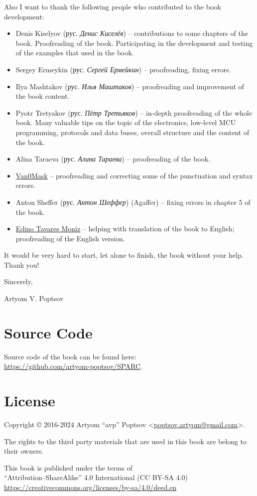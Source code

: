 \documentclass[../sparc.tex]{subfiles}
\begin{document}
Also I want to thank the following people who contributed to the book
development:
\begin{itemize}
\item Denis Kiselyov (рус. \emph{Денис Киселёв}) -- contributions to some
  chapters of the book.  Proofreading of the book.  Participating in the
  development and testing of the examples that used in the book.
\item Sergey Ermeykin (рус. \emph{Сергей Ермейкин}) -- proofreading, fixing
  errors.
\item Ilya Mashtakov (рус. \emph{Илья Маштаков}) – proofreading and improvement
  of the book content.
\item Pyotr Tretyakov (рус. \emph{Пётр Третьяков}) -- in-depth proofreading of
  the whole book.  Many valuable tips on the topic of the electronics, low-level
  MCU programming, protocols and data buses, overall structure and the content
  of the book.
\item Alina Taraeva (рус. \emph{Алина Тараева}) -- proofreading of the book.
\item \href{https://github.com/V4n0M4sk}{Van0Mask} -- proofreading and correcting some of the punctuation and syntax errors.
\item Anton Sheffer (рус. \emph{Антон Шеффер}) (Agaffer) -- fixing errors in
  chapter 5 of the book.
\item \href{https://github.com/onidemon37}{Edino Tavares Moniz} -- helping with
  translation of the book to English; proofreading of the English version.
\end{itemize}

It would be very hard to start, let alone to finish, the book without your help.
Thank you!
\vspace{5mm}

\hspace{1cm}Sincerely,

\hspace{1cm}Artyom V. Poptsov

\section*{Source Code}

Source code of the book can be found here: \\
\url{https://github.com/artyom-poptsov/SPARC}.

\section*{License}

Copyright © 2016-2024 Artyom ``avp'' Poptsov
<\href{mailto:poptsov.artyom@gmail.com}{poptsov.artyom@gmail.com}>.

The rights to the third party materials that are used in this book are belong to
their owners.

This book is published under the terms of \\ ``Attribution--ShareAlike'' 4.0
International (CC BY-SA 4.0)
\\ \url{https://creativecommons.org/licenses/by-sa/4.0/deed.en}
\end{document}
